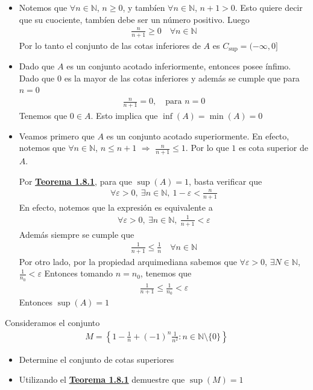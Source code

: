 \documentclass[12pt]{book}
\begin{document}
\begin{itemize}
    \item[\textbf{a)}] Notemos que $\forall n \in \mathbb{N}$, $n \geq 0$, y tambíen  $\forall n \in \mathbb{N}$, $n+1 > 0$. Esto quiere decir que su cuociente, tambíen debe ser un número positivo. Luego 
    \begin{align*}
        \frac{n}{n+1} \geq 0 \quad \forall n \in \mathbb{N}
    \end{align*}
    Por lo tanto el conjunto de las cotas inferiores de $A$ es $C_{\sup}=(-\infty, 0]$
    \item[\textbf{b)}] Dado que $A$ es un conjunto acotado inferiormente, entonces posee ínfimo. Dado que $0$ es la mayor de las cotas inferiores y además se cumple que para $n=0$
    \begin{align*}
        \frac{n}{n+1}=0, \quad \text{para $n=0$}
    \end{align*}
    Tenemos que $0 \in A$. Esto implica que $\inf(A)=\min(A)=0$
    \item[\textbf{c)}] Veamos primero que $A$ es un conjunto acotado superiormente. En efecto, notemos que $\forall n \in \mathbb{N}$, $n\leq n+1$  $\Longrightarrow$ $\displaystyle \frac{n}{n+1} \leq 1$. Por lo que $1$ es cota superior de $A$.

Por \hyperref[th:teo1.8.1]{\textbf{Teorema 1.8.1}}, para que $\sup(A)=1$, basta verificar que 
\begin{align*}
    \forall\varepsilon>0, \ \exists n \in \mathbb{N}, \ 1-\varepsilon<\frac{n}{n+1}
\end{align*}
En efecto, notemos que la expresión es equivalente a
\begin{align*}
   \forall\varepsilon>0, \ \exists n \in \mathbb{N}, \  \frac{1}{n+1}< \varepsilon
\end{align*}
Además siempre se cumple que 
\begin{align*}
    \frac{1}{n+1}\leq \frac{1}{n}  \quad \forall n \in \mathbb{N}
\end{align*}
    Por otro lado, por la propiedad arquimediana sabemos que $\forall \varepsilon >0$, $\exists N \in \mathbb{N}$, $\displaystyle \frac{1}{n_0}<\varepsilon$
    Entonces tomando $n=n_0$, tenemos que 
    \begin{align*}
        \frac{1}{n+1}\leq\frac{1}{n_0}<\varepsilon
    \end{align*}
    Entonces $\sup(A)=1$
\end{itemize}
\begin{prob}{}{}
    Consideramos el conjunto
    \begin{align*}
        M=\left\{ 1-\frac{1}{n}+(-1)^n\frac{1}{n^2} : n \in \mathbb{N}\setminus\{0 \}\right\}
    \end{align*}
    \begin{itemize}
        \item[\textbf{a)}] Determine el conjunto de cotas superiores
        \item[\textbf{b)}] Utilizando el \hyperref[th:teo1.8.1]{\textbf{Teorema 1.8.1}} demuestre que $\sup(M)=1$
    \end{itemize}
\end{prob}
\end{document}
